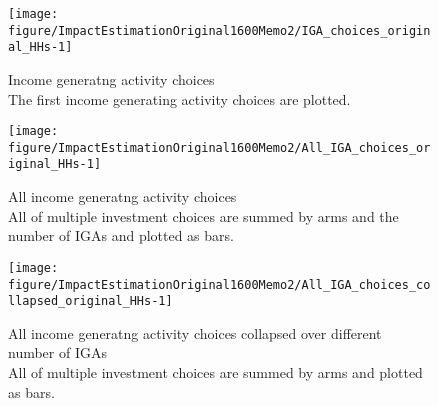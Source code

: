 \begin{Schunk}
\begin{figure}

{\centering \texttt{[image: figure/ImpactEstimationOriginal1600Memo2/IGA\_choices\_original\_HHs-1]} 

}

\caption{Income generatng activity choices\\ {\footnotesize The first income generating activity choices are plotted.\setlength{\baselineskip}{8pt}}}\label{Figure IGA choices original HHs}
\end{figure}
\end{Schunk}
\begin{Schunk}
\begin{figure}

{\centering \texttt{[image: figure/ImpactEstimationOriginal1600Memo2/All\_IGA\_choices\_original\_HHs-1]} 

}

\caption{All income generatng activity choices\\ {\footnotesize All of multiple investment choices are summed by arms and the number of IGAs and plotted as bars. \setlength{\baselineskip}{8pt}}}\label{Figure All IGA choices original HHs}
\end{figure}
\end{Schunk}
\begin{Schunk}
\begin{figure}

{\centering \texttt{[image: figure/ImpactEstimationOriginal1600Memo2/All\_IGA\_choices\_collapsed\_original\_HHs-1]} 

}

\caption{All income generatng activity choices collapsed over different number of IGAs\\ {\footnotesize All of multiple investment choices are summed by arms and plotted as bars. \setlength{\baselineskip}{8pt}}}\label{Figure All IGA choices collapsed original HHs}
\end{figure}
\end{Schunk}

